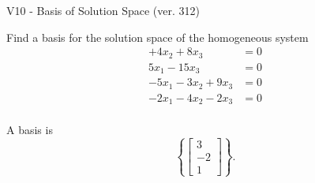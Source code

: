 \begin{exercise}
  \begin{exerciseTitle}V10 - Basis of Solution Space (ver. 312)\end{exerciseTitle}
  \begin{exerciseStatement}
    Find a basis for the solution space of the homogeneous system 
\begin{align*}
 + 4 x_ 2 + 8 x_ 3 &= 0  \\ 
  5 x_ 1 -15 x_ 3 &= 0  \\ 
  -5 x_ 1 -3 x_ 2 + 9 x_ 3 &= 0  \\ 
  -2 x_ 1 -4 x_ 2 -2 x_ 3 &= 0  \\ 
 \end{align*}


 
  \end{exerciseStatement}

  \begin{exerciseAnswer}
   A basis is   
\[\left\{\left[\begin{array}{c}
3 \\
-2 \\
1
\end{array}\right]\right\}.\]

  


  \end{exerciseAnswer}
\end{exercise}